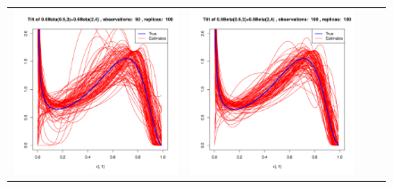 \begin{figure}[h]
\begin{tabular}{cccc}
	
	\includegraphics[width=\textwidth/4]{../img/p05_a05_b3_p05_a2_b4/tilted/K2/densities/n50_R100.pdf}
	&
	\includegraphics[width=\textwidth/4]{../img/p05_a05_b3_p05_a2_b4/tilted/K2/densities/n100_R100.pdf}

\end{tabular}
\end{figure}
